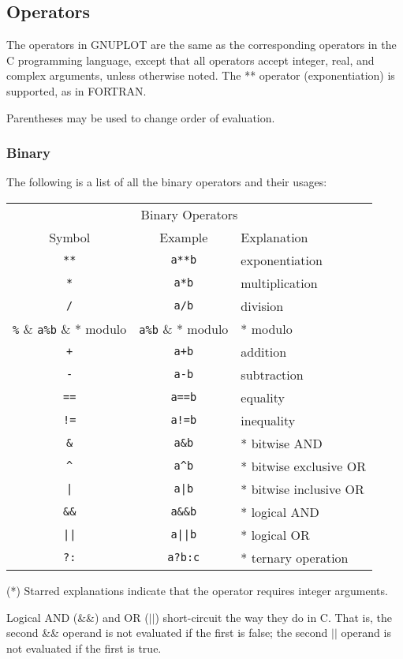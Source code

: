 \subsection{Operators}
The operators in GNUPLOT are the same as the corresponding operators
in the C programming language, except that all operators accept
integer, real, and complex arguments, unless otherwise noted.
The ** operator (exponentiation) is supported, as in FORTRAN.

Parentheses may be used to change order of evaluation.
\subsubsection{Binary}
The following is a list of all the binary operators and their
usages:


\begin{center}
\begin{tabular}{|ccl|} \hline
\multicolumn{3}{|c|}{Binary Operators} \\
Symbol & Example & Explanation \\ \hline
\verb~**~ & \verb~a**b~ & exponentiation\\
\verb~*~ & \verb~a*b~ & multiplication\\
\verb~/~ & \verb~a/b~ & division\\
\verb~%~ & \verb~a%b~ & * modulo\\
\verb~+~ & \verb~a+b~ & addition\\
\verb~-~ & \verb~a-b~ & subtraction\\
\verb~==~ & \verb~a==b~ & equality\\
\verb~!=~ & \verb~a!=b~ & inequality\\
\verb~&~ & \verb~a&b~ & * bitwise AND\\
\verb~^~ & \verb~a^b~ & * bitwise exclusive OR\\
\verb~|~ & \verb~a|b~ & * bitwise inclusive OR\\
\verb~&&~ & \verb~a&&b~ & * logical AND\\
\verb~||~ & \verb~a||b~ & * logical OR\\
\verb~?:~ & \verb~a?b:c~ & * ternary operation\\
\hline
\end{tabular}
\end{center}
(*) Starred explanations indicate that the operator requires
integer arguments.

Logical AND (\&\&) and OR ($|$$|$) short-circuit the way they do in C.
That is, the second \&\& operand is not evaluated if the first is
false; the second $|$$|$ operand is not evaluated if the first is true.

